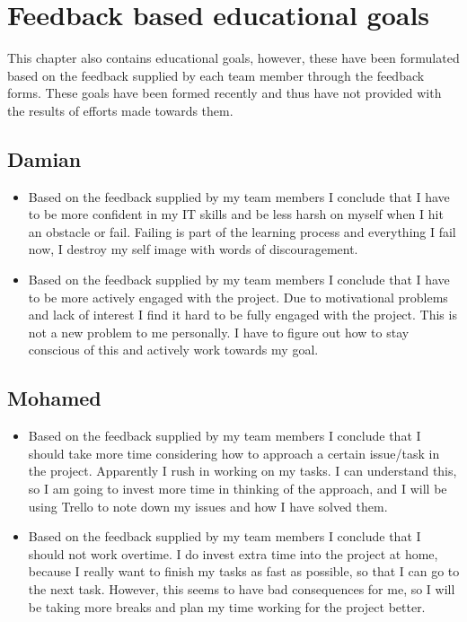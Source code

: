 \documentclass[12pt]{article}
\begin{document}
	\section{Feedback based educational goals}
	This chapter also contains educational goals, however, these have been formulated based on the feedback supplied by each team member through the feedback forms. These goals have been formed recently and thus have not provided with the results of efforts made towards them.
	\subsection{Damian}
	\begin{itemize}
		\item Based on the feedback supplied by my team members I conclude that I have to be more confident in my IT skills and be less harsh on myself when I hit an obstacle or fail. Failing is part of the learning process and everything I fail now, I destroy my self image with words of discouragement.
		\item Based on the feedback supplied by my team members I conclude that I have to be more actively engaged with the project. Due to motivational problems and lack of interest I find it hard to be fully engaged with the project. This is not a new problem to me personally. I have to figure out how to stay conscious of this and actively work towards my goal.
	\end{itemize}
	\subsection{Mohamed}
	\begin{itemize}
		\item Based on the feedback supplied by my team members I conclude that I should take more time considering how to approach a certain issue/task in the project. Apparently I rush in working on my tasks. I can understand this, so I am going to invest more time in thinking of the approach, and I will be using Trello to note down my issues and how I have solved them.
		\item Based on the feedback supplied by my team members I conclude that I should not work overtime. I do invest extra time into the project at home, because I really want to finish my tasks as fast as possible, so that I can go to the next task. However, this seems to have bad consequences for me, so I will be taking more breaks and plan my time working for the project better.		
	\end{itemize}
\end{document}
